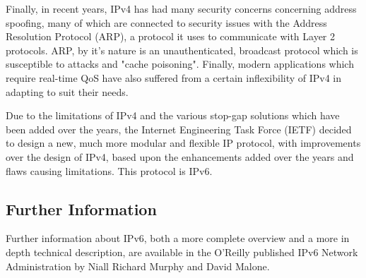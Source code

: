 Finally, in recent years, IPv4 has had many security concerns concerning
address spoofing, many of which are connected to security issues with
the Address Resolution Protocol (ARP), a protocol it uses to communicate
with Layer 2 protocols. ARP, by it's nature is an unauthenticated, 
broadcast protocol which is susceptible to attacks and "cache poisoning".
Finally, modern applications which require real-time QoS have also 
suffered from a certain inflexibility of IPv4 in adapting to suit their 
needs.


Due to the limitations of IPv4 and the various stop-gap solutions which
have been added over the years, the Internet Engineering Task Force
(IETF) decided to design a new, much more modular and flexible IP
protocol, with improvements over the design of IPv4, based upon the
enhancements added over the years and flaws causing limitations. This
protocol is IPv6.

\subsection{Further Information}

Further information about IPv6, both a more complete overview and
a more in depth technical description, are available in the O'Reilly
published IPv6 Network Administration by Niall Richard Murphy and 
David Malone.
